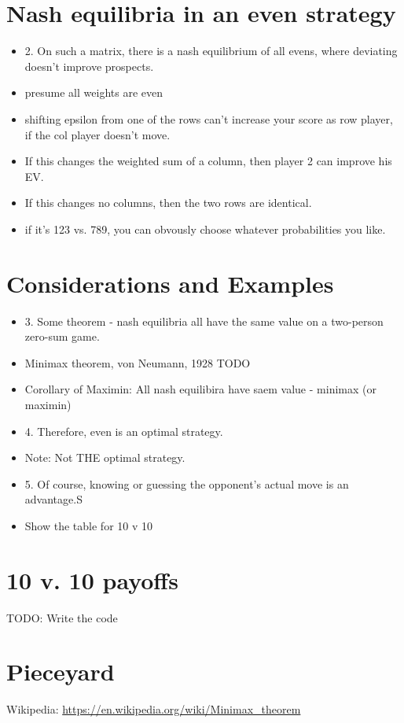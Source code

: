 \documentclass[11pt, oneside]{article} 	%
\begin{document}
\section{Nash equilibria in an even strategy}
\begin{itemize}
\item 2. On such a matrix, there is a nash equilibrium of all evens, where deviating doesn't improve prospects.
\item presume all weights are even
\item shifting epsilon from one of the rows can't increase your score as row player, if the col player doesn't move.
\item If this changes the weighted sum of a column, then player 2 can improve his EV.
\item If this changes no columns, then the two rows are identical.
\item if it's 123 vs.  789, you can obvously choose whatever probabilities you like.
\end{itemize}

\section{Considerations and Examples}
\begin{itemize}
\item 3. Some theorem - nash equilibria all have the same value on a two-person zero-sum game.
\item Minimax theorem, von Neumann, 1928 TODO    
\item Corollary of Maximin: All nash equilibira have saem value - minimax (or maximin)
\item 4. Therefore, even is an optimal strategy.
\item Note: Not THE optimal strategy.
\item  5. Of course, knowing or guessing the opponent's actual move is an advantage.S
\item Show the table for 10 v 10
\end{itemize}

\section{10 v. 10 payoffs}

TODO: Write the code

\section{Pieceyard}


\begin{thebibliography}{9}
Wikipedia: \url{https://en.wikipedia.org/wiki/Minimax_theorem}
\end{thebibliography}
\end{document}
